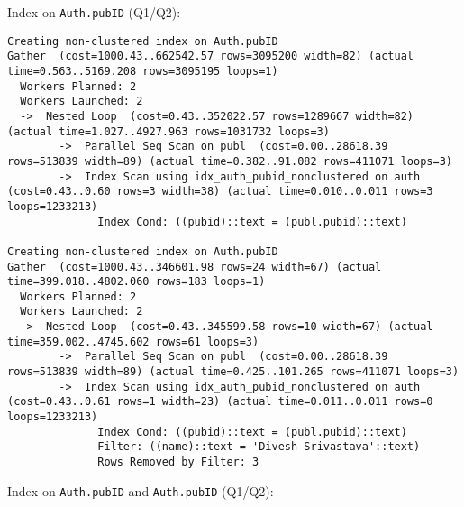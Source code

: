 \documentclass[11pt]{scrartcl}
\begin{document}
Index on \texttt{Auth.pubID} (Q1/Q2):

{\small
\parskip0pt\begin{verbatim}
Creating non-clustered index on Auth.pubID
Gather  (cost=1000.43..662542.57 rows=3095200 width=82) (actual time=0.563..5169.208 rows=3095195 loops=1)
  Workers Planned: 2
  Workers Launched: 2
  ->  Nested Loop  (cost=0.43..352022.57 rows=1289667 width=82) (actual time=1.027..4927.963 rows=1031732 loops=3)
        ->  Parallel Seq Scan on publ  (cost=0.00..28618.39 rows=513839 width=89) (actual time=0.382..91.082 rows=411071 loops=3)
        ->  Index Scan using idx_auth_pubid_nonclustered on auth  (cost=0.43..0.60 rows=3 width=38) (actual time=0.010..0.011 rows=3 loops=1233213)  
              Index Cond: ((pubid)::text = (publ.pubid)::text)

Creating non-clustered index on Auth.pubID
Gather  (cost=1000.43..346601.98 rows=24 width=67) (actual time=399.018..4802.060 rows=183 loops=1)
  Workers Planned: 2
  Workers Launched: 2
  ->  Nested Loop  (cost=0.43..345599.58 rows=10 width=67) (actual time=359.002..4745.602 rows=61 loops=3)
        ->  Parallel Seq Scan on publ  (cost=0.00..28618.39 rows=513839 width=89) (actual time=0.425..101.265 rows=411071 loops=3)
        ->  Index Scan using idx_auth_pubid_nonclustered on auth  (cost=0.43..0.61 rows=1 width=23) (actual time=0.011..0.011 rows=0 loops=1233213)  
              Index Cond: ((pubid)::text = (publ.pubid)::text)
              Filter: ((name)::text = 'Divesh Srivastava'::text)
              Rows Removed by Filter: 3
\end{verbatim}}

Index on \texttt{Auth.pubID} and \texttt{Auth.pubID} (Q1/Q2):
\end{document}
